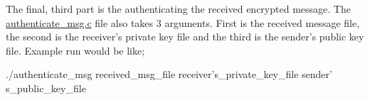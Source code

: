 The final, third part is the authenticating the received encrypted message. The \hyperlink{authenticate__msg_8c}{authenticate\-\_\-msg.\-c} file also takes 3 arguments. First is the received message file, the second is the receiver's private key file and the third is the sender's public key file. Example run would be like; 
\begin{DoxyCode}
 ./authenticate_msg received_msg_file receiver's_private_key_file sender'
      s_public_key_file
\end{DoxyCode}
 